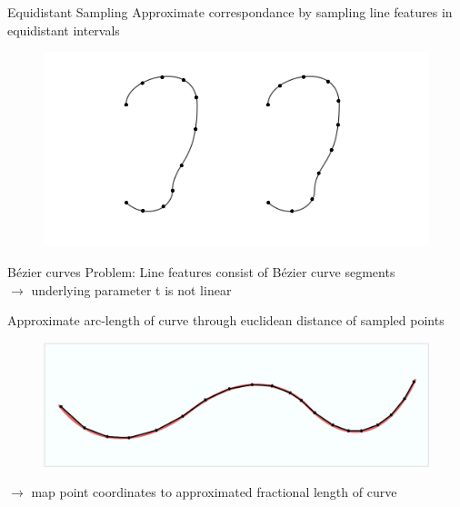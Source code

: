 \documentclass[xcolor=x11names,compress]{beamer}
\begin{document}
    \begin{frame}{Equidistant Sampling}
        Approximate correspondance by sampling line features in equidistant intervals
        \begin{figure}
            \centering
            \includegraphics[width=.7\textwidth]{../resources/figures/ears_diffparam.pdf}
        \end{figure}
    \end{frame}

    \begin{frame}{B\'{e}zier curves}
        Problem: Line features consist of B\'{e}zier curve segments\\
        $\rightarrow$ underlying parameter t is not linear

        Approximate arc-length of curve through euclidean distance of sampled points
        \begin{figure}
            \centering
            \includegraphics[width=.7\textwidth]{../resources/figures/distance_computation.pdf}
        \end{figure}
        $\rightarrow$ map point coordinates to approximated fractional length of curve
    \end{frame}

\end{document}
